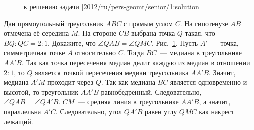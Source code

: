 \ifsolution
\begin{figure}\centering
    \caption{к решению задачи \ref{2012/ru/pers-geomt/senior/1:solution}}
    \label{2012/ru/pers-geomt/senior/1:solution:fig}
\end{figure}%
\fi %

\problem
Дан прямоугольный треугольник $ABC$ с прямым углом $C$.
На гипотенузе $AB$ отмечена её середина $M$.
На стороне $CB$ выбрана точка $Q$ такая, что $BQ : QC = 2 : 1$.
Докажите, что $\angle QAB = \angle QMC$.
\solution
\label{2012/ru/pers-geomt/senior/1:solution}%
Рис.~\ref{2012/ru/pers-geomt/senior/1:solution:fig}.
Пусть $A'$~--- точка, симметричная точке $A$ относительно $C$.
Тогда $BC$~--- медиана в треугольнике $AA'B$.
Так как точка пересечения медиан делит каждую из медиан в отношении $2 : 1$,
то $Q$ является точкой пересечения медиан треугольника $AA'B$.
Значит, медиана $A'M$ проходит через $Q$.
Так как медиана $BC$ является одновременно и высотой, то треугольник $AA'B$
равнобедренный.
Следовательно, $\angle QAB = \angle QA'B$.
$CM$~--- средняя линия в треугольнике $AA'B$, а значит, параллельна $A'C$.
Следовательно, угол $QA'B$ равен углу $QMC$ как накрест лежащий.
\endproblem

